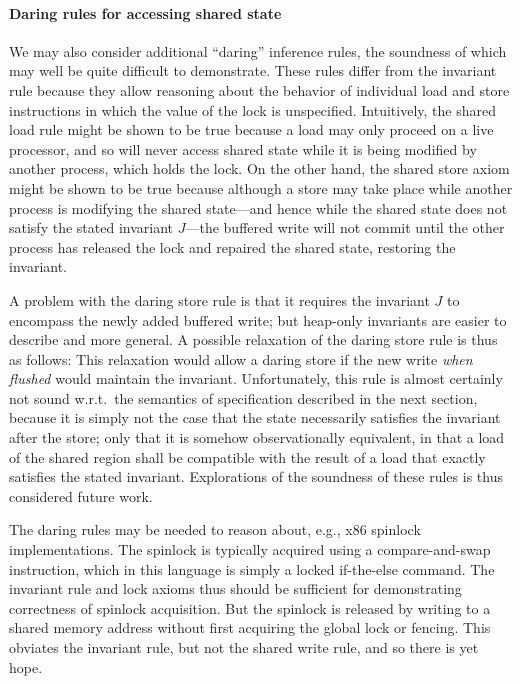 \documentclass[11pt]{report}         %
\begin{document}
\paragraph{Daring rules for accessing shared state} We may also consider additional ``daring'' inference rules, the soundness of which may well be quite difficult to demonstrate. 
These rules differ from the invariant rule because they allow reasoning about the behavior of individual load and store instructions in which the value of the lock is unspecified. Intuitively, the shared load rule might be shown to be true because a load may only proceed on a live processor, and so will never access shared state while it is being modified by another process, which holds the lock. On the other hand, the shared store axiom might be shown to be true because although a store may take place while another process is modifying the shared state---and hence while the shared state does not satisfy the stated invariant $J$---the buffered write will not commit until the other process has released the lock and repaired the shared state, restoring the invariant.

A problem with the daring store rule is that it requires the invariant $J$ to encompass the newly added buffered write; but heap-only invariants are easier to describe and more general. A possible relaxation of the daring store rule is thus as follows: 
This relaxation would allow a daring store if the new write \emph{when flushed} would maintain the invariant. Unfortunately, this rule is almost certainly not sound w.r.t.\ the semantics of specification described in the next section, because it is simply not the case that the state necessarily satisfies the invariant after the store; only that it is somehow observationally equivalent, in that a load of the shared region shall be  compatible with the result of a load that exactly satisfies the stated invariant. Explorations of the soundness of these rules is thus considered future work. 

The daring rules may be needed to reason about, e.g., x86 spinlock implementations. The spinlock is typically acquired using a compare-and-swap instruction, which in this language is simply a locked if-the-else command. The invariant rule and lock axioms thus should be sufficient for demonstrating correctness of spinlock acquisition. But the spinlock is released by writing to a shared memory address without first acquiring the global lock or fencing. This obviates the invariant rule, but not the shared write rule, and so there is yet hope. 
\end{document}
